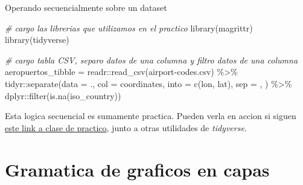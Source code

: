 \documentclass[
  10pt,
  ignorenonframetext,
]{beamer}
\newenvironment{Shaded}{\begin{snugshade}}{\end{snugshade}}
\newcommand{\AttributeTok}[1]{\textcolor[rgb]{0.77,0.63,0.00}{#1}}
\newcommand{\CommentTok}[1]{\textcolor[rgb]{0.56,0.35,0.01}{\textit{#1}}}
\newcommand{\FunctionTok}[1]{\textcolor[rgb]{0.00,0.00,0.00}{#1}}
\newcommand{\NormalTok}[1]{#1}
\newcommand{\OtherTok}[1]{\textcolor[rgb]{0.56,0.35,0.01}{#1}}
\newcommand{\SpecialCharTok}[1]{\textcolor[rgb]{0.00,0.00,0.00}{#1}}
\newcommand{\StringTok}[1]{\textcolor[rgb]{0.31,0.60,0.02}{#1}}
\begin{document}
\begin{frame}[fragile]{Operando secuencialmente sobre un dataset}
\protect\hypertarget{operando-secuencialmente-sobre-un-dataset}{}
\scriptsize

\begin{Shaded}
\begin{Highlighting}[]
\CommentTok{\# cargo las librerias que utilizamos en el practico}
\FunctionTok{library}\NormalTok{(magrittr)}
\FunctionTok{library}\NormalTok{(tidyverse)}

\CommentTok{\# cargo tabla CSV, separo datos de una columna y filtro datos de una columna}
\NormalTok{aeropuertos\_tibble }\OtherTok{=}\NormalTok{ readr}\SpecialCharTok{::}\FunctionTok{read\_csv}\NormalTok{(}\StringTok{\textquotesingle{}airport{-}codes.csv\textquotesingle{}}\NormalTok{) }\SpecialCharTok{\%\textgreater{}\%}
\NormalTok{  tidyr}\SpecialCharTok{::}\FunctionTok{separate}\NormalTok{(}\AttributeTok{data =}\NormalTok{ ., }
                  \AttributeTok{col =} \StringTok{\textquotesingle{}coordinates\textquotesingle{}}\NormalTok{, }
                  \AttributeTok{into =} \FunctionTok{c}\NormalTok{(}\StringTok{\textquotesingle{}lon\textquotesingle{}}\NormalTok{, }\StringTok{\textquotesingle{}lat\textquotesingle{}}\NormalTok{), }
                  \AttributeTok{sep =} \StringTok{\textquotesingle{}, \textquotesingle{}}\NormalTok{) }\SpecialCharTok{\%\textgreater{}\%}
\NormalTok{  dplyr}\SpecialCharTok{::}\FunctionTok{filter}\NormalTok{(}\FunctionTok{is.na}\NormalTok{(iso\_country))}
\end{Highlighting}
\end{Shaded}

\normalsize

Esta logica secuencial es sumamente practica. Pueden verla en accion si
siguen
\href{https://rpubs.com/mlangleib/linea_comandos_practico_12}{este link
a clase de practico}, junto a otras utilidades de \emph{tidyverse}.
\end{frame}

\hypertarget{gramatica-de-graficos-en-capas}{%
\section{Gramatica de graficos en
capas}\label{gramatica-de-graficos-en-capas}}
\end{document}
